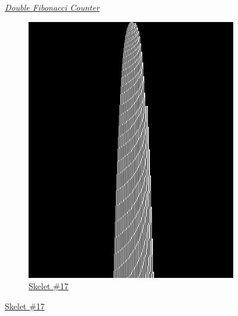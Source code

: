 \begin{figure}[h!]
\begin{minipage}{\textwidth}
{\begin{minipage}{0.3\textwidth}
                \caption*{\href{https://bbchallenge.org/1RB0RA_0LC1RA_1RE1LD_1LC0LD_---0RB}{Skelet \#10}}
                {\small\emph{\href{https://bbchallenge.org/1RB0RA_0LC1RA_1RE1LD_1LC0LD_---0RB}{Double Fibonacci Counter}}}
            \end{minipage}
        }
        \hfill
        \begin{subfigure}{0.3\textwidth}
            \centering
            \includegraphics[width=\linewidth]{figures/sporadic-machines/sk17.png}
            \caption*{\href{https://bbchallenge.org/1RB---_0LC1RE_0LD1LC_1RA1LB_0RB0RA}{Skelet \#17}}
        \end{subfigure}
    \end{minipage}

    \vspace{2.5em}


\end{figure}
